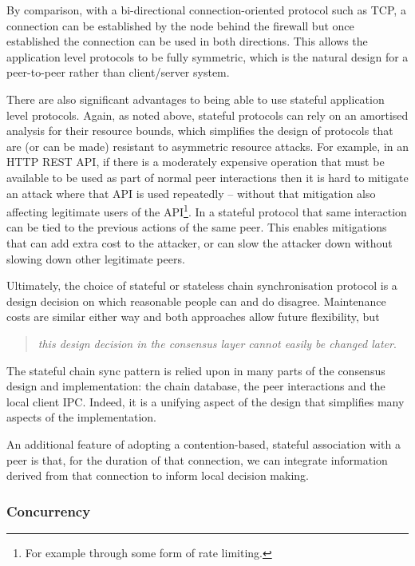 \documentclass[11pt,a4paper]{article}
\begin{document}
By comparison, with a bi-directional connection-oriented protocol such
as TCP, a connection can be established by the node behind the firewall
but once established the connection can be used in both directions. This
allows the application level protocols to be fully symmetric, which is
the natural design for a peer-to-peer rather than client/server system.

There are also significant advantages to being able to use stateful
application level protocols. Again, as noted above, stateful protocols
can rely on an amortised analysis for their resource bounds, which
simplifies the design of protocols that are (or can be made) resistant
to asymmetric resource attacks. For example, in an HTTP REST API, if
there is a moderately expensive operation that must be available to be
used as part of normal peer interactions then it is hard to mitigate an
attack where that API is used repeatedly -- without that mitigation also
affecting legitimate users of the API\footnote{For example through some
  form of rate limiting.}. In a stateful protocol that same interaction
can be tied to the previous actions of the same peer. This enables
mitigations that can add extra cost to the attacker, or can slow the
attacker down without slowing down other legitimate peers.

Ultimately, the choice of stateful or stateless chain synchronisation
protocol is a design decision on which reasonable people can and do
disagree. Maintenance costs are similar either way and both approaches
allow future flexibility, but

\begin{quote}
\emph{this design decision in the consensus layer cannot easily
be changed later}.
\end{quote}

The stateful chain sync pattern is relied upon in many parts of the
consensus design and implementation: the chain database, the peer
interactions and the local client IPC. Indeed, it is a unifying aspect
of the design that simplifies many aspects of the implementation.

An additional feature of adopting a contention-based, stateful
association with a peer is that, for the duration of that connection, we
can integrate information derived from that connection to inform local
decision making.

\subsubsection{Concurrency}
\label{concurrency}
\end{document}
